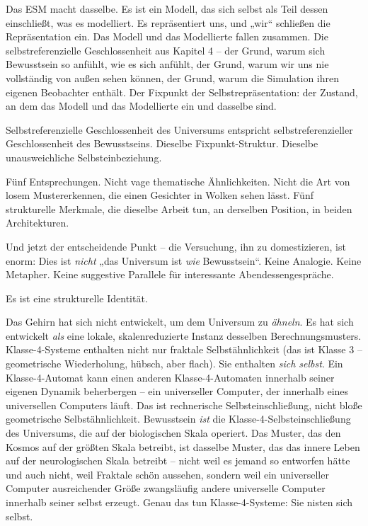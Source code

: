 \documentclass[11pt, twoside, openright]{book}
\begin{document}
Das ESM macht dasselbe. Es ist ein Modell, das sich selbst als Teil dessen einschließt, was es modelliert. Es repräsentiert uns, und „wir“ schließen die Repräsentation ein. Das Modell und das Modellierte fallen zusammen. Die selbstreferenzielle Geschlossenheit aus Kapitel 4 -- der Grund, warum sich Bewusstsein so anfühlt, wie es sich anfühlt, der Grund, warum wir uns nie vollständig von außen sehen können, der Grund, warum die Simulation ihren eigenen Beobachter enthält. Der Fixpunkt der Selbstrepräsentation: der Zustand, an dem das Modell und das Modellierte ein und dasselbe sind.

Selbstreferenzielle Geschlossenheit des Universums entspricht selbstreferenzieller Geschlossenheit des Bewusstseins. Dieselbe Fixpunkt-Struktur. Dieselbe unausweichliche Selbsteinbeziehung.

Fünf Entsprechungen. Nicht vage thematische Ähnlichkeiten. Nicht die Art von losem Mustererkennen, die einen Gesichter in Wolken sehen lässt. Fünf strukturelle Merkmale, die dieselbe Arbeit tun, an derselben Position, in beiden Architekturen.

Und jetzt der entscheidende Punkt -- die Versuchung, ihn zu domestizieren, ist enorm: Dies ist \textit{nicht} „das Universum ist \textit{wie} Bewusstsein“. Keine Analogie. Keine Metapher. Keine suggestive Parallele für interessante Abendessengespräche.

Es ist eine strukturelle Identität.

Das Gehirn hat sich nicht entwickelt, um dem Universum zu \textit{ähneln}. Es hat sich entwickelt \textit{als} eine lokale, skalenreduzierte Instanz desselben Berechnungsmusters. Klasse-4-Systeme enthalten nicht nur fraktale Selbstähnlichkeit (das ist Klasse 3 -- geometrische Wiederholung, hübsch, aber flach). Sie enthalten \textit{sich selbst}. Ein Klasse-4-Automat kann einen anderen Klasse-4-Automaten innerhalb seiner eigenen Dynamik beherbergen -- ein universeller Computer, der innerhalb eines universellen Computers läuft. Das ist rechnerische Selbsteinschließung, nicht bloße geometrische Selbstähnlichkeit. Bewusstsein \textit{ist} die Klasse-4-Selbsteinschließung des Universums, die auf der biologischen Skala operiert. Das Muster, das den Kosmos auf der größten Skala betreibt, ist dasselbe Muster, das das innere Leben auf der neurologischen Skala betreibt -- nicht weil es jemand so entworfen hätte und auch nicht, weil Fraktale schön aussehen, sondern weil ein universeller Computer ausreichender Größe zwangsläufig andere universelle Computer innerhalb seiner selbst erzeugt. Genau das tun Klasse-4-Systeme: Sie nisten sich selbst.
\end{document}
